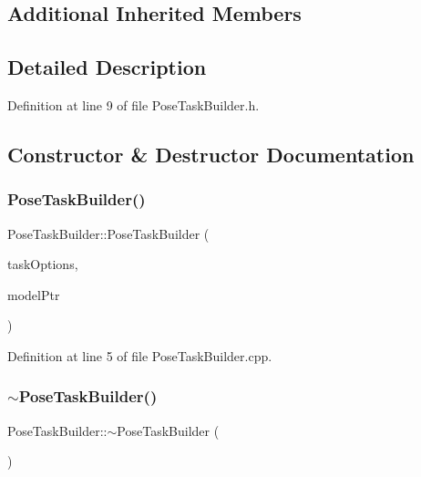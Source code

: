 \subsection*{Additional Inherited Members}


\subsection{Detailed Description}


Definition at line 9 of file Pose\+Task\+Builder.\+h.



\subsection{Constructor \& Destructor Documentation}
\hypertarget{classocra_1_1PoseTaskBuilder_aee81134b7353f3ee147a6129a0a265a9}{}\label{classocra_1_1PoseTaskBuilder_aee81134b7353f3ee147a6129a0a265a9} 
\subsubsection{\texorpdfstring{Pose\+Task\+Builder()}{PoseTaskBuilder()}}
{\footnotesize\ttfamily Pose\+Task\+Builder\+::\+Pose\+Task\+Builder (\begin{DoxyParamCaption}\item[{const \hyperlink{classocra_1_1TaskBuilderOptions}{Task\+Builder\+Options} \&}]{task\+Options,  }\item[{Model\+::\+Ptr}]{model\+Ptr }\end{DoxyParamCaption})}



Definition at line 5 of file Pose\+Task\+Builder.\+cpp.

\hypertarget{classocra_1_1PoseTaskBuilder_ad71d138985d6a4c6145818b5ab51b72a}{}\label{classocra_1_1PoseTaskBuilder_ad71d138985d6a4c6145818b5ab51b72a} 
\subsubsection{\texorpdfstring{$\sim$\+Pose\+Task\+Builder()}{~PoseTaskBuilder()}}
{\footnotesize\ttfamily Pose\+Task\+Builder\+::$\sim$\+Pose\+Task\+Builder (\begin{DoxyParamCaption}{ }\end{DoxyParamCaption})\hspace{0.3cm}{\ttfamily [virtual]}}



